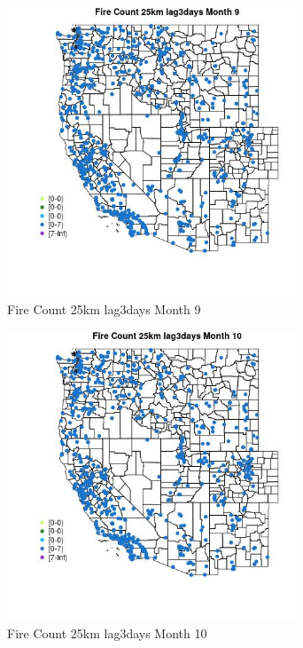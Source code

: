 \begin{figure} 
\centering  
\includegraphics[width=0.77\textwidth]{Code_Outputs/Report_ML_input_PM25_Step4_part_e_de_duplicated_aves_compiled_2019-05-21wNAs_MapObsMo9Fire_Count_25km_lag3days.jpg} 
\caption{\label{fig:Report_ML_input_PM25_Step4_part_e_de_duplicated_aves_compiled_2019-05-21wNAsMapObsMo9Fire_Count_25km_lag3days}Fire Count 25km lag3days Month 9} 
\end{figure} 
 

\begin{figure} 
\centering  
\includegraphics[width=0.77\textwidth]{Code_Outputs/Report_ML_input_PM25_Step4_part_e_de_duplicated_aves_compiled_2019-05-21wNAs_MapObsMo10Fire_Count_25km_lag3days.jpg} 
\caption{\label{fig:Report_ML_input_PM25_Step4_part_e_de_duplicated_aves_compiled_2019-05-21wNAsMapObsMo10Fire_Count_25km_lag3days}Fire Count 25km lag3days Month 10} 
\end{figure} 
 

